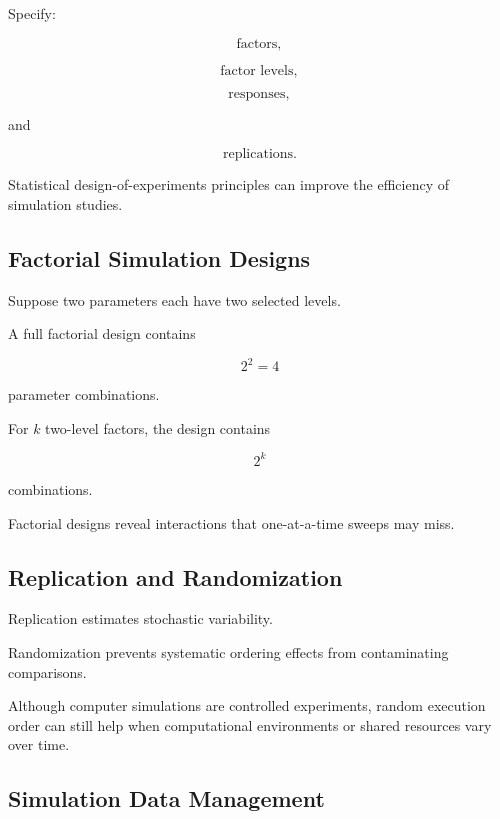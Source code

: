 Specify:

\[
\boxed{
\text{factors},
}
\]

\[
\boxed{
\text{factor levels},
}
\]

\[
\boxed{
\text{responses},
}
\]

and

\[
\boxed{
\text{replications}.
}
\]

Statistical design-of-experiments principles can improve the efficiency of
simulation studies.

\subsection{Factorial Simulation Designs}
\label{subsec:factorial-simulation-design}

Suppose two parameters each have two selected levels.

A full factorial design contains

\[
\boxed{
2^2=4
}
\]

parameter combinations.

For \(k\) two-level factors, the design contains

\[
\boxed{
2^k
}
\]

combinations.

Factorial designs reveal interactions that one-at-a-time sweeps may miss.

\subsection{Replication and Randomization}
\label{subsec:simulation-replication-randomization}

Replication estimates stochastic variability.

Randomization prevents systematic ordering effects from contaminating
comparisons.

Although computer simulations are controlled experiments, random execution
order can still help when computational environments or shared resources
vary over time.

\subsection{Simulation Data Management}
\label{subsec:simulation-data-management}

